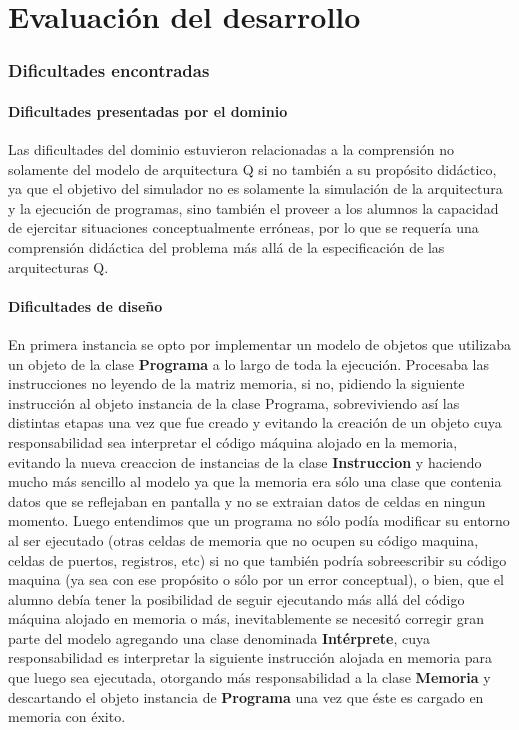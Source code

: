 \part{Evaluación del desarrollo}

\section{Dificultades encontradas}

\subsection{Dificultades presentadas por el dominio}
Las dificultades del dominio estuvieron relacionadas a la comprensión no solamente del modelo de arquitectura Q si no también a su propósito didáctico, ya que el objetivo del simulador no es solamente la simulación de la arquitectura y la ejecución de programas, sino también el proveer a los alumnos la capacidad de ejercitar situaciones conceptualmente erróneas, por lo que se requería una comprensión didáctica del problema más allá de la especificación de las arquitecturas Q. 

\subsection{Dificultades de diseño}
En primera instancia se opto por implementar un modelo de objetos que utilizaba un objeto de la clase \textbf{Programa} a lo largo de toda la ejecución. Procesaba las instrucciones no leyendo de la matriz memoria, si no, pidiendo la siguiente instrucción al objeto instancia de la clase Programa, sobreviviendo así las distintas etapas una vez que fue creado y evitando la creación de un objeto cuya responsabilidad sea interpretar el código máquina alojado en la memoria, evitando la nueva creaccion de instancias de la clase \textbf{Instruccion} y haciendo mucho más sencillo al modelo ya que la memoria era sólo una clase que contenia datos que se reflejaban en pantalla y no se extraian datos de celdas en ningun momento. Luego entendimos que un programa no sólo podía modificar su entorno al ser ejecutado (otras celdas de memoria que no ocupen su código maquina, celdas de puertos, registros, etc) si no que también podría sobreescribir su código maquina (ya sea con ese propósito o sólo por un error conceptual), o bien, que el alumno debía tener la posibilidad de seguir ejecutando más allá del código máquina alojado en memoria o más, inevitablemente se necesitó corregir gran parte del modelo agregando una clase denominada \textbf{Intérprete}, cuya responsabilidad es interpretar la siguiente instrucción alojada en memoria para que luego sea ejecutada, otorgando más responsabilidad a la clase \textbf{Memoria} y descartando el objeto instancia de \textbf{Programa} una vez que éste es cargado en memoria con éxito.\\

